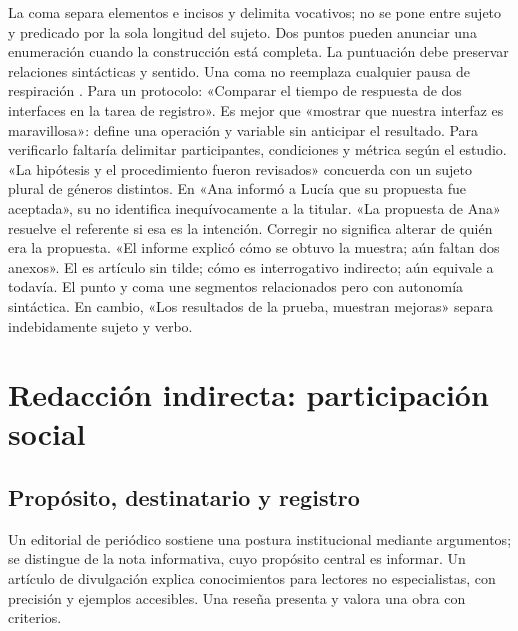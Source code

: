 La coma separa elementos e incisos y delimita vocativos; no se pone entre sujeto y predicado por la sola longitud del sujeto. Dos puntos pueden anunciar una enumeración cuando la construcción está completa. La puntuación debe preservar relaciones sintácticas y sentido. Una coma no reemplaza cualquier pausa de respiración \cite[entradas tilde, coma, dos puntos, aun]{rae}.
Para un protocolo: «Comparar el tiempo de respuesta de dos interfaces en la tarea de registro». Es mejor que «mostrar que nuestra interfaz es maravillosa»: define una operación y variable sin anticipar el resultado. Para verificarlo faltaría delimitar participantes, condiciones y métrica según el estudio.
«La hipótesis y el procedimiento fueron revisados» concuerda con un sujeto plural de géneros distintos. En «Ana informó a Lucía que su propuesta fue aceptada», su no identifica inequívocamente a la titular. «La propuesta de Ana» resuelve el referente si esa es la intención. Corregir no significa alterar de quién era la propuesta.
«El informe explicó cómo se obtuvo la muestra; aún faltan dos anexos». El es artículo sin tilde; cómo es interrogativo indirecto; aún equivale a todavía. El punto y coma une segmentos relacionados pero con autonomía sintáctica. En cambio, «Los resultados de la prueba, muestran mejoras» separa indebidamente sujeto y verbo.

\section{Redacción indirecta: participación social}\label{sec:e2}
\subsection{Propósito, destinatario y registro}
Un editorial de periódico sostiene una postura institucional mediante argumentos; se distingue de la nota informativa, cuyo propósito central es informar. Un artículo de divulgación explica conocimientos para lectores no especialistas, con precisión y ejemplos accesibles. Una reseña presenta y valora una obra con criterios.

